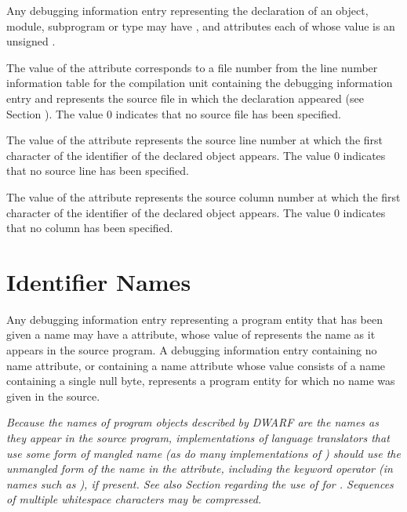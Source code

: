 Any debugging information 
\hypertarget{chap:DWATdeclfilefilecontainingsourcedeclaration}{}
entry 
\hypertarget{chap:DWATdecllinelinenumberofsourcedeclaration}{}
representing 
\hypertarget{chap:DWATdeclcolumncolumnpositionofsourcedeclaration}{}
the
declaration of an object, module, subprogram or
type 
may 
have
\DWATdeclfile, 
\DWATdeclline{} and 
\DWATdeclcolumn{}
attributes each of whose value is an unsigned
.

The value of 
the 
\DWATdeclfile{}
attribute 
corresponds to
a file number from the line number information table for the
compilation unit containing the debugging information entry and
represents the source file in which the declaration appeared
(see Section ). 
The value 0 indicates that no source file
has been specified.

The value of 
the \DWATdeclline{} attribute represents
the source line number at which the first character of
the identifier of the declared object appears. The value 0
indicates that no source line has been specified.

The value of 
the \DWATdeclcolumn{} attribute represents
the source column number at which the first character of
the identifier of the declared object appears. The value 0
indicates that no column has been specified.

\section{Identifier Names}
\label{chap:identifiernames}
Any\hypertarget{chap:DWATnamenameofdeclaration}{}
debugging information entry 
representing 
a program entity that has been given a name may have a 
\DWATname{} 
attribute, whose value of 
\CLASSstring{} represents the name as it appears in
the source program. A debugging information entry containing
no name attribute, or containing a name attribute whose value
consists of a name containing a single null byte, represents
a program entity for which no name was given in the source.

\textit{Because the names of program objects described by DWARF are 
the names as they appear in the source program, implementations
of language translators that use some form of mangled name
(as do many implementations of ) should use the 
unmangled form of the name in the 
\DWATname{} attribute,
including the keyword operator (in names such as ),
if present. See also 
Section  regarding the use of 
\DWATlinkagename{} for 
.
Sequences of multiple whitespace characters may be compressed.}

